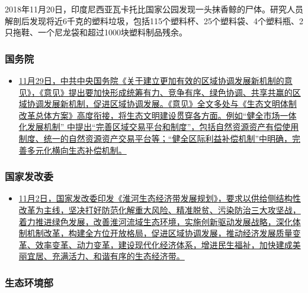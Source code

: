 \documentclass[]{book}
\providecommand{\tightlist}{%
  \setlength{\itemsep}{0pt}\setlength{\parskip}{0pt}}
\begin{document}
2018年11月20日，印度尼西亚瓦卡托比国家公园发现一头抹香鲸的尸体。研究人员解剖后发现将近6千克的塑料垃圾，包括115个塑料杯、25个塑料袋、4个塑料瓶、2只拖鞋、一个尼龙袋和超过1000块塑料制品残余。

\hypertarget{ux56fdux52a1ux9662}{%
\subsubsection*{国务院}\label{ux56fdux52a1ux9662}}

\begin{itemize}
\tightlist
\item
  \href{http://www.gov.cn/xinwen/2018-11/29/content_5344537.htm}{11月29日，中共中央国务院《关于建立更加有效的区域协调发展新机制的意见》，《意见》提出要加快形成统筹有力、竞争有序、绿色协调、共享共赢的区域协调发展新机制，促进区域协调发展。《意见》全文多处与《生态文明体制改革总体方案》高度衔接，将生态文明建设贯穿各方面。例如``健全市场一体化发展机制'' 中提出``完善区域交易平台和制度''，包括自然资源资产有偿使用制度、统一的自然资源资产交易平台等；``健全区际利益补偿机制''中明确，完善多元化横向生态补偿机制。}
\end{itemize}

\hypertarget{ux56fdux5bb6ux53d1ux6539ux59d4}{%
\subsubsection*{国家发改委}\label{ux56fdux5bb6ux53d1ux6539ux59d4}}

\begin{itemize}
\tightlist
\item
  \href{http://www.ndrc.gov.cn/zcfb/zcfbghwb/201811/t20181107_919133.html}{11月2日，国家发改委印发《淮河生态经济带发展规划》，要求以供给侧结构性改革为主线，坚决打好防范化解重大风险、精准脱贫、污染防治三大攻坚战，着力推进绿色发展，改善淮河流域生态环境，实施创新驱动发展战略，深化体制机制改革，构建全方位开放格局，促进区域协调发展，推动经济发展质量变革、效率变革、动力变革，建设现代化经济体系，增进民生福祉，加快建成美丽宜居、充满活力、和谐有序的生态经济带。}
\end{itemize}

\hypertarget{ux751fux6001ux73afux5883ux90e8}{%
\subsubsection*{生态环境部}\label{ux751fux6001ux73afux5883ux90e8}}
\end{document}
